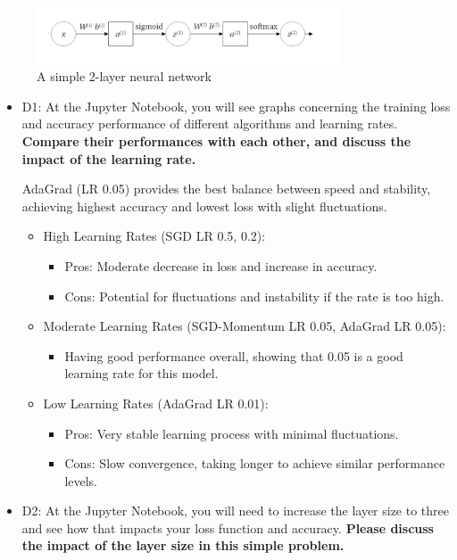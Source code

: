 \documentclass[12pt]{article}
\begin{document}
\begin{figure}[hbt]
	\centering
	\includegraphics[width=0.8\textwidth]{q3.png}
	\caption{A simple 2-layer neural network }
\end{figure}
\begin{itemize}
	\item D1: At the Jupyter Notebook, you will see graphs concerning the training loss and accuracy performance of different algorithms and learning rates. \textbf{Compare their performances with each other, and discuss the impact of the learning rate.}

	      AdaGrad (LR 0.05) provides the best balance between speed and stability, achieving highest accuracy and lowest loss with slight fluctuations.

	      \begin{itemize}
		      \item High Learning Rates (SGD LR 0.5, 0.2):
		            \begin{itemize}
			            \item Pros: Moderate decrease in loss and increase in accuracy.
			            \item Cons: Potential for fluctuations and instability if the rate is too high.
		            \end{itemize}
		      \item Moderate Learning Rates (SGD-Momentum LR 0.05, AdaGrad LR 0.05):
		            \begin{itemize}
			            \item Having good performance overall, showing that 0.05 is a good learning rate for this model.
		            \end{itemize}
		      \item Low Learning Rates (AdaGrad LR 0.01):
		            \begin{itemize}
			            \item Pros: Very stable learning process with minimal fluctuations.
			            \item Cons: Slow convergence, taking longer to achieve similar performance levels.
		            \end{itemize}
	      \end{itemize}
	\item D2: At the Jupyter Notebook, you will need to increase the layer size to three and see how that impacts your loss function and accuracy. \textbf{Please discuss the impact of the layer size in this simple problem.}


\end{itemize}
\end{document}
